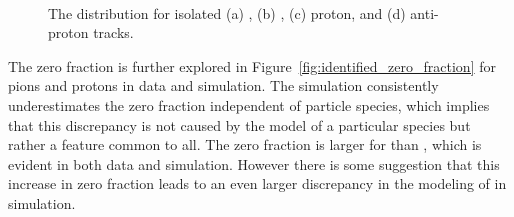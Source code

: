 \begin{figure}[h]
{}
~
\caption{The \ep distribution for isolated (a) \pip, (b) \pim, (c) proton, and (d) anti-proton tracks.}
\label{fig:identified_eoverp}
\end{figure}

The zero fraction is further explored in Figure~\ref{fig:identified_zero_fraction} for pions and protons in data and simulation. 
The simulation consistently underestimates the zero fraction independent of particle species, which implies that this discrepancy is not caused by the model of a particular species but rather a feature common to all.
The zero fraction is larger for \pim than \pip, which is evident in both data and simulation.
However there is some suggestion that this increase in zero fraction leads to an even larger discrepancy in the modeling of \pim in simulation.

